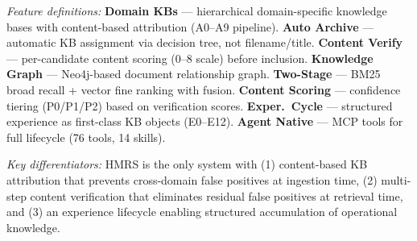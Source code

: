 
\begin{table}[t]
\centering
\caption{Feature comparison of HMRS Knowledge Platform with existing RAG systems.
\CIRCLE{} = full support, \LEFTcircle{} = partial/limited support, \Circle{} = not supported.
HMRS uniquely combines domain-organized KBs, content verification,
experience lifecycle, and agent-native architecture.}
\label{tab:system-comparison}
\begin{minipage}{\textwidth}
\vspace{4pt}
\footnotesize
\emph{Feature definitions:}
\textbf{Domain KBs} --- hierarchical domain-specific knowledge bases with
content-based attribution (A0--A9 pipeline).
\textbf{Auto Archive} --- automatic KB assignment via decision tree, not filename/title.
\textbf{Content Verify} --- per-candidate content scoring (0--8 scale) before inclusion.
\textbf{Knowledge Graph} --- Neo4j-based document relationship graph.
\textbf{Two-Stage} --- BM25 broad recall + vector fine ranking with fusion.
\textbf{Content Scoring} --- confidence tiering (P0/P1/P2) based on verification scores.
\textbf{Exper.\ Cycle} --- structured experience as first-class KB objects (E0--E12).
\textbf{Agent Native} --- MCP tools for full lifecycle (76 tools, 14 skills).

\emph{Key differentiators:}
HMRS is the only system with (1) content-based KB attribution that prevents
cross-domain false positives at ingestion time, (2) multi-step content verification
that eliminates residual false positives at retrieval time, and (3) an experience
lifecycle enabling structured accumulation of operational knowledge.
\end{minipage}
\end{table}
